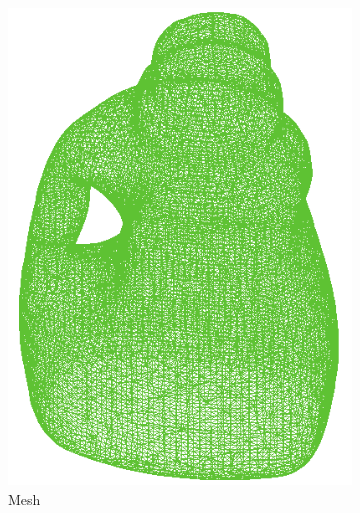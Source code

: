 \begin{figure}[!t]
  \centering
  \begin{subfigure}{0.3\linewidth}
    \centering
    \includegraphics[width=\linewidth]{Figures/ObjRecog/mesh.png}
    \caption{Mesh}
    \label{fig:objrecog:meshcloudgrid:mesh}
  \end{subfigure}
  \begin{subfigure}{0.3\linewidth}
    \centering

\end{subfigure}
\end{figure}
